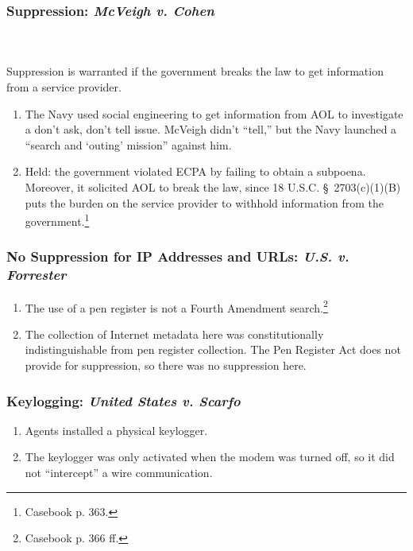 \subsubsection{Suppression: \emph{McVeigh v. Cohen}}
~\\\\
Suppression is warranted if the government breaks the law to get information 
from a service provider.

\begin{enumerate}
    \item The Navy used social engineering to get information from AOL to 
    investigate a don't ask, don't tell issue. McVeigh didn't ``tell,'' but 
    the Navy launched a \enquote{search and `outing' mission} against him.
    \item Held: the government violated ECPA by failing to obtain a subpoena. 
    Moreover, it solicited AOL to break the law, since 18 U.S.C. \S\ 
    2703(c)(1)(B) puts the burden on the service provider to withhold 
    information from the government.\footnote{Casebook p. 363.}
\end{enumerate}

\subsubsection{No Suppression for IP Addresses and URLs: \emph{U.S. v. 
Forrester}}

\begin{enumerate}
    \item The use of a pen register is not a Fourth Amendment 
    search.\footnote{Casebook p. 366 ff.}
    \item The collection of Internet metadata here was constitutionally 
    indistinguishable from pen register collection. The Pen Register Act does 
    not provide for suppression, so there was no suppression here.
\end{enumerate}

\subsubsection{Keylogging: \emph{United States v. Scarfo}}

\begin{enumerate}
    \item Agents installed a physical keylogger.
    \item The keylogger was only activated when the modem was turned off, so 
    it did not ``intercept'' a wire communication.
\end{enumerate}

